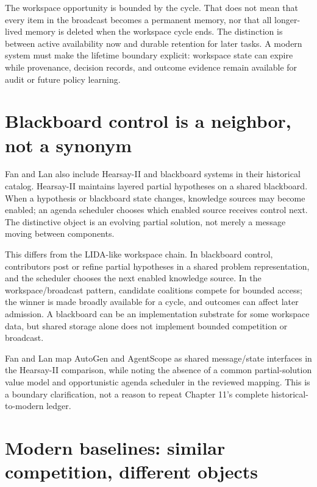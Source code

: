 The workspace opportunity is bounded by the cycle. That does not mean that every item in the broadcast becomes a permanent memory, nor that all longer-lived memory is deleted when the workspace cycle ends. The distinction is between active availability now and durable retention for later tasks. A modern system must make the lifetime boundary explicit: workspace state can expire while provenance, decision records, and outcome evidence remain available for audit or future policy learning.

\section{Blackboard control is a neighbor, not a synonym}
\label{sec:ch14-blackboard}

Fan and Lan also include Hearsay-II and blackboard systems in their historical catalog. Hearsay-II maintains layered partial hypotheses on a shared blackboard. When a hypothesis or blackboard state changes, knowledge sources may become enabled; an agenda scheduler chooses which enabled source receives control next. The distinctive object is an evolving partial solution, not merely a message moving between components.

This differs from the LIDA-like workspace chain. In blackboard control, contributors post or refine partial hypotheses in a shared problem representation, and the scheduler chooses the next enabled knowledge source. In the workspace/broadcast pattern, candidate coalitions compete for bounded access; the winner is made broadly available for a cycle, and outcomes can affect later admission. A blackboard can be an implementation substrate for some workspace data, but shared storage alone does not implement bounded competition or broadcast.

Fan and Lan map AutoGen and AgentScope as shared message/state interfaces in the Hearsay-II comparison, while noting the absence of a common partial-solution value model and opportunistic agenda scheduler in the reviewed mapping. This is a boundary clarification, not a reason to repeat Chapter 11's complete historical-to-modern ledger.

\section{Modern baselines: similar competition, different objects}
\label{sec:ch14-baselines}

